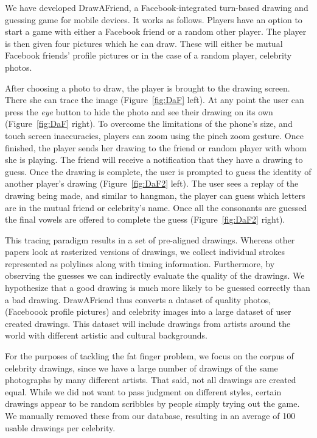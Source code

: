 We have developed DrawAFriend, a Facebook-integrated turn-based drawing and guessing game for mobile devices.  It works as follows. Players have an option to start a game with either a Facebook friend or a random other player.  The player is then given four pictures which he can draw. These will either be mutual Facebook friends' profile pictures or in the case of a random player, celebrity photos.

After choosing a photo to draw, the player is brought to the drawing screen. There she can trace the image (Figure~\ref{fig:DaF} left). At any point the user can press the {\em eye} button to hide the photo and see their drawing on its own (Figure~\ref{fig:DaF} right). To overcome the limitations of the phone's size, and touch screen inaccuracies, players can zoom using the pinch zoom gesture.
Once finished, the player sends her drawing to the friend or random player with whom she is playing. The friend will receive a notification that they have a drawing to guess. Once the drawing is complete, the user is prompted to guess the identity of another player's drawing (Figure~\ref{fig:DaF2} left). The user sees a replay of the drawing being made, and similar to hangman, the player can guess which letters are in the mutual friend or celebrity's name. Once all the consonants are guessed the final vowels are offered to complete the guess (Figure~\ref{fig:DaF2} right).

This tracing paradigm results in a set of pre-aligned drawings. Whereas other papers look at rasterized versions of drawings, we collect individual strokes represented as polylines along with timing information.  Furthermore, by observing the guesses we can indirectly evaluate the quality of the drawings. We hypothesize that a good drawing is much more likely to be guessed correctly than a bad drawing. DrawAFriend thus converts a dataset of quality photos, (Faceboook profile pictures) and celebrity images into a large dataset of user created drawings. This dataset will include drawings from artists around the world with different artistic and cultural backgrounds.

For the purposes of tackling the fat finger problem, we focus on the corpus of celebrity drawings, since we have a large number of drawings of the same photographs by many different artists. That said, not all drawings are created equal. While we did not want to pass judgment on different styles, certain drawings appear to be random scribbles by people simply trying out the game. We manually removed these from our database, resulting in an average of 100 usable drawings per celebrity. 

